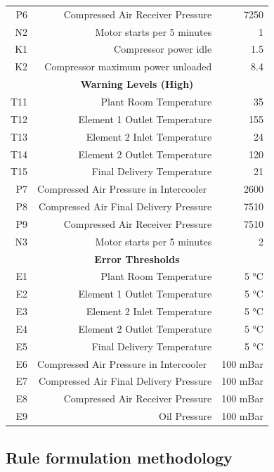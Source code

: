 \begin{table}[htbp]
\begin{tabular}{rrr}
    P6    & Compressed Air Receiver Pressure & 7250 \\
    N2    & Motor starts per 5 minutes & 1 \\
    K1    & Compressor power idle & 1.5 \\
    K2    & Compressor maximum power unloaded & 8.4 \\
    \multicolumn{3}{c}{\textbf{Warning Levels (High)}} \\
    T11   & Plant Room Temperature & 35 \\
    T12   & Element 1 Outlet Temperature & 155 \\
    T13   & Element 2 Inlet Temperature & 24 \\
    T14   & Element 2 Outlet Temperature & 120 \\
    T15   & Final Delivery Temperature & 21 \\
    P7    & Compressed Air Pressure in Intercooler  & 2600 \\
    P8    & Compressed Air Final Delivery Pressure & 7510 \\
    P9    & Compressed Air Receiver Pressure & 7510 \\
    N3    & Motor starts per 5 minutes & 2 \\
    \multicolumn{3}{c}{\textbf{Error Thresholds}} \\
    E1    & Plant Room Temperature & 5 °C \\
    E2    & Element 1 Outlet Temperature & 5 °C \\
    E3    & Element 2 Inlet Temperature & 5 °C \\
    E4    & Element 2 Outlet Temperature & 5 °C \\
    E5    & Final Delivery Temperature & 5 °C \\
    E6    & Compressed Air Pressure in Intercooler  & 100 mBar \\
    E7    & Compressed Air Final Delivery Pressure & 100 mBar \\
    E8    & Compressed Air Receiver Pressure & 100 mBar \\
    E9    & Oil Pressure & 100 mBar \\
    \bottomrule
    \end{tabular}%
  \label{tab:addlabel}%
\end{table}%


\subsection{Rule formulation methodology}
\label{subsec:rulemethodology}


